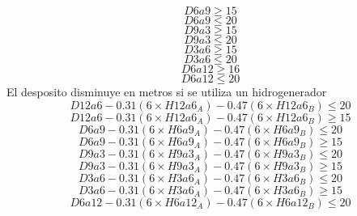 \begin{equation}
D6a9 \geq 15 
\end{equation}
\begin{equation}
D6a9 \leq 20
\end{equation}
\begin{equation}
D9a3 \geq 15 
\end{equation}
\begin{equation}
D9a3 \leq 20
\end{equation}
\begin{equation}
D3a6 \geq 15 
\end{equation}
\begin{equation}
D3a6 \leq 20
\end{equation}
\begin{equation}
D6a12 \geq 16  
\end{equation}
\begin{equation}
D6a12 \leq 20
\end{equation}
El desposito disminuye en metros si se utiliza un hidrogenerador
\begin{equation}
D12a6 - 0.31 (6 \times H12a6_{A}) - 0.47 (6 \times H12a6_{B}) \leq 20    
\end{equation}
\begin{equation}
D12a6 - 0.31 (6 \times H12a6_{A}) - 0.47 (6 \times H12a6_{B}) \geq 15    
\end{equation}
\begin{equation}
D6a9 - 0.31 (6 \times H6a9_{A}) - 0.47 (6 \times H6a9_{B}) \leq 20    
\end{equation}
\begin{equation}
D6a9 - 0.31 (6 \times H6a9_{A}) - 0.47 (6 \times H6a9_{B}) \geq 15    
\end{equation}
\begin{equation}
D9a3 - 0.31 (6 \times H9a3_{A}) - 0.47 (6 \times H9a3_{B}) \leq 20    
\end{equation}
\begin{equation}
D9a3 - 0.31 (6 \times H9a3_{A}) - 0.47 (6 \times H9a3_{B}) \geq 15    
\end{equation}
\begin{equation}
D3a6 - 0.31 (6 \times H3a6_{A}) - 0.47 (6 \times H3a6_{B}) \leq 20    
\end{equation}
\begin{equation}
D3a6 - 0.31 (6 \times H3a6_{A}) - 0.47 (6 \times H3a6_{B}) \geq 15    
\end{equation}
\begin{equation}
D6a12 - 0.31 (6 \times H6a12_{A}) - 0.47 (6 \times H6a12_{B}) \leq 20    
\end{equation}
